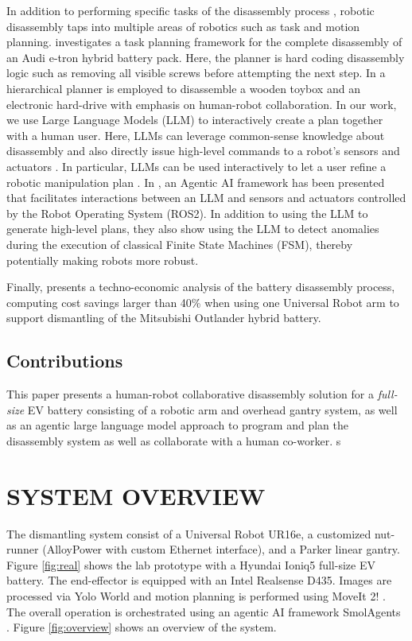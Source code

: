 \documentclass[letterpaper, 10 pt, conference]{ieeeconf}  %
\begin{document}
In addition to performing specific tasks of the disassembly process \cite{huang2026robotic,tan2025robotic}, robotic disassembly taps into multiple areas of robotics such as task and motion planning. \cite{choux2021task} investigates a task planning framework for the complete disassembly of an Audi e-tron hybrid battery pack. Here, the planner is hard coding disassembly logic such as removing all visible screws before attempting the next step. In \cite{lee2022robot} a hierarchical planner is employed to disassemble a wooden toybox and an electronic hard-drive with emphasis on human-robot collaboration. In our work, we use Large Language Models (LLM) to interactively create a plan together with a human user. Here, LLMs can leverage common-sense knowledge about disassembly and also directly issue high-level commands to a robot's sensors and actuators \cite{raptis2025agentic}. In particular, LLMs can be used interactively to let a user refine a robotic manipulation plan \cite{lynch2023interactive}. In \cite{rachwal2025rai}, an Agentic AI framework has been presented that facilitates interactions between an LLM and sensors and actuators controlled by the Robot Operating System (ROS2). In addition to using the LLM to generate high-level plans, they also show using the LLM to detect anomalies during the execution of classical Finite State Machines (FSM), thereby potentially making robots more robust. 

Finally, \cite{hathaway2024technoeconomic} presents a techno-economic analysis of the battery disassembly process, computing cost savings larger than 40\% when using one Universal Robot arm to support dismantling of the Mitsubishi Outlander hybrid battery.  

\subsection{Contributions}
This paper presents a human-robot collaborative disassembly solution for a \textit{full-size} EV battery consisting of a robotic arm and overhead gantry system, as well as an agentic large language model approach to program and plan the disassembly system as well as collaborate with a human co-worker. s

\section{SYSTEM OVERVIEW}
 The dismantling system consist of a Universal Robot UR16e, a customized nut-runner (AlloyPower with custom Ethernet interface), and a Parker linear gantry.  Figure \ref{fig:real} shows the lab prototype with a Hyundai Ioniq5 full-size EV battery.  The end-effector is equipped with an Intel Realsense D435. Images are processed via Yolo World and motion planning is performed using MoveIt 2! \cite{coleman2014reducing}. The overall operation is orchestrated using an agentic AI framework SmolAgents \cite{smolagents}. Figure \ref{fig:overview} shows an overview of the system. 
\end{document}
